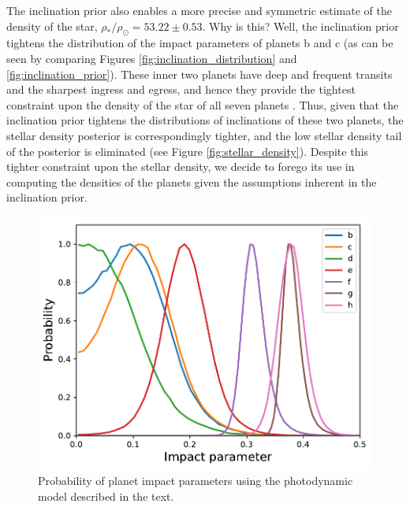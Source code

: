 \documentclass[fleqn,usenatbib]{mnras} %
\begin{document}
The inclination prior also enables a more precise and symmetric 
estimate of the density of the star, $\rho_*/\rho_\odot {=} 53.22{\pm} 0.53$.  Why is this?  Well, the 
inclination prior tightens the distribution of the impact parameters of planets b 
and c (as can be seen by comparing Figures \ref{fig:inclination_distribution} and 
\ref{fig:inclination_prior}).  These inner two planets have deep and frequent 
transits and the sharpest ingress and egress, and hence they provide the tightest 
constraint upon the density of the star of all seven planets \citep{Ducrot2020}.  
Thus, given that the inclination prior tightens the distributions of inclinations 
of these two planets, the stellar density posterior is correspondingly tighter, and 
the low stellar density tail of the posterior is eliminated (see Figure \ref{fig:stellar_density}).  Despite this tighter 
constraint upon the stellar density, we decide to forego its use in computing the 
densities of the planets given the assumptions inherent in the inclination prior.

\begin{figure}
    \centering
    \includegraphics[width=\hsize]{figures/impact_parameter_noprior.pdf}
    \caption{Probability of planet impact parameters using the photodynamic model described in the text.}
    \label{fig:impact_parameter}
\end{figure}
\end{document}
